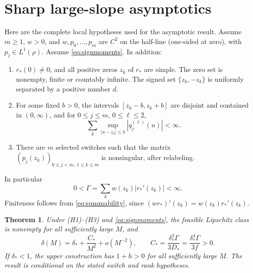 \documentclass[11pt,a4paper]{article}
\numberwithin{equation}{section}
\newtheorem{theorem}{Theorem}[section]
\theoremstyle{remark}\newtheorem{remark}[theorem]{Remark}
\newcommand{\ds}{\delta_*}
\newcommand{\Ds}{D_*}
\newcommand{\Cs}{C_*}
\newcommand{\rs}{r_*}
\begin{document}
\section{Sharp large-slope asymptotics}\label{sec:general}
Here are the complete local hypotheses used for the asymptotic result.
Assume $m\ge1$, $w>0$, and $w,p_0,\ldots,p_m$ are $C^2$ on the half-line
(one-sided at zero), with $p_j\in L^1(\rho)$. Assume
\eqref{eq:signmoments}. In addition:
\begin{enumerate}[label=(H\arabic*),leftmargin=16mm]
\item $\rs(0)\ne0$, and all positive zeros $z_k$ of $\rs$ are simple.
The zero set is nonempty, finite or countably infinite. The signed set
$\{z_k,-z_k\}$ is uniformly separated by a positive number $d$.
\item For some fixed $b>0$, the intervals $[z_k-b,z_k+b]$ are disjoint
and contained in $(0,\infty)$, and for $0\le j\le m$, $0\le\ell\le2$,
\begin{equation}
 \sum_k\sup_{|u-z_k|\le b}|q_j^{(\ell)}(u)|<\infty.\label{eq:summability}
\end{equation}
\item There are $m$ selected switches such that the matrix
$(p_j(z_k))_{0\le j<m,\ 1\le k\le m}$ is nonsingular, after relabeling.
\end{enumerate}
In particular
\begin{equation}
 0<\Gamma=\sum_k w(z_k)|\rs'(z_k)|<\infty.\label{eq:gamma}
\end{equation}
Finiteness follows from \eqref{eq:summability}, since
$(w\rs)'(z_k)=w(z_k)\rs'(z_k)$.

\begin{theorem}\label{thm:asymptotic}
Under (H1)--(H3) and \eqref{eq:signmoments}, the feasible Lipschitz class is
nonempty for all sufficiently large $M$, and
\begin{equation}
 \boxed{\delta(M)=\ds+\frac{\Cs}{M^2}+o(M^{-2}),\qquad
 \Cs=\frac{\ds^3\Gamma}{3\Ds}=\frac{\ds^4\Gamma}{3f}>0.}\label{eq:main}
\end{equation}
If $\ds<1$, the upper construction has $1+h>0$ for all sufficiently large
$M$. The result is conditional on the stated switch and rank hypotheses.
\end{theorem}
\end{document}
